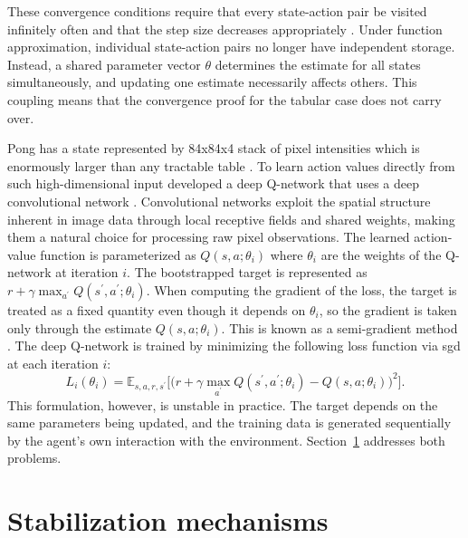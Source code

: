 These convergence conditions require that every state-action pair be visited infinitely often and that the step size decreases appropriately \citep[p.~131]{suttonReinforcementLearningIntroduction2020}. Under function approximation, individual state-action pairs no longer have independent storage. Instead, a shared parameter vector $\theta$ determines the estimate for all states simultaneously, and updating one estimate necessarily affects others. This coupling means that the convergence proof for the tabular case does not carry over.

Pong has a state represented by 84x84x4 stack of pixel intensities which is enormously larger than any tractable table \citep[p.~534]{mnihHumanlevelControlDeep2015}. To learn action values directly from such high-dimensional input \citet[p.~529]{mnihHumanlevelControlDeep2015} developed a deep Q-network that uses a deep convolutional network \citep{lecunGradientbasedLearningApplied1998}. Convolutional networks exploit the spatial structure inherent in image data through local receptive fields and shared weights, making them a natural choice for processing raw pixel observations. The learned action-value function is parameterized as $Q\left(s,a;\theta_i\right)$ where $\theta_i$ are the weights of the Q-network at iteration $i$. The bootstrapped target is represented as $r + \gamma \max_{a^{\prime}} Q\left(s^{\prime}, a^{\prime}; \theta_i\right)$. When computing the gradient of the loss, the target is treated as a fixed quantity even though it depends on $\theta_i$, so the gradient is taken only through the estimate $Q\left(s,a;\theta_i\right)$. This is known as a semi-gradient method \citep[p.~202]{suttonReinforcementLearningIntroduction2020}. The deep Q-network is trained by minimizing the following loss function via \acrfull{sgd} at each iteration $i$:
\begin{equation}\label{eq:q_learning_loss_function}
	L_i\left(\theta_i\right) = \mathbb{E}_{s, a, r, s^{\prime}} \Bigg[\bigg(r + \gamma \max_{a^{\prime}} Q(s^{\prime}, a^{\prime};\theta_i) - Q(s,a;\theta_i)\bigg)^2\Bigg].
\end{equation}
This formulation, however, is unstable in practice. The target depends on the same parameters being updated, and the training data is generated sequentially by the agent's own interaction with the environment. Section~\ref{sec:stabilization} addresses both problems.

\section{Stabilization mechanisms}
\label{sec:stabilization}

